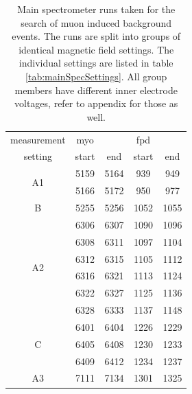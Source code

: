   
  
\begin{table}
	\centering
	\caption[Main Spectrometer Runs]{Main spectrometer runs taken for the search of muon induced background events. The runs are split into groups of identical magnetic field settings. The individual settings are listed in table \ref{tab:mainSpecSettings}. All group members have different inner electrode voltages, refer to appendix for those as well.}
	\label{tab:mainSpecRuns}
	\begin{tabular}{|c|cc|cc|}
		\hline
		measurement & myo & & fpd & \\
		setting& start & end & start & end\\
		\hline
		\multirow{2}{*}{A1} & 5159 & 5164 & 939 & 949 \\
		 & 5166 & 5172 & 950 & 977\\
		\hline
		\multirow{1}{*}{B} &5255 & 5256 & 1052 & 1055\\
		\hline
		\multirow{6}{*}{A2}& 6306 & 6307 & 1090 & 1096\\
		& 6308 & 6311 & 1097 & 1104\\
		& 6312 & 6315 & 1105 & 1112\\
		& 6316 & 6321 & 1113 & 1124\\
		& 6322 & 6327 & 1125 & 1136\\
		& 6328 & 6333 & 1137 & 1148\\
		\hline
		
		\multirow{3}{*}{C}& 6401 & 6404 & 1226 & 1229\\
		& 6405 & 6408 & 1230 & 1233\\
		& 6409 & 6412 & 1234 & 1237\\
		\hline
		
		
		
		A3& 7111 & 7134 & 1301 & 1325\\
		\hline
	\end{tabular}
	
\end{table}

